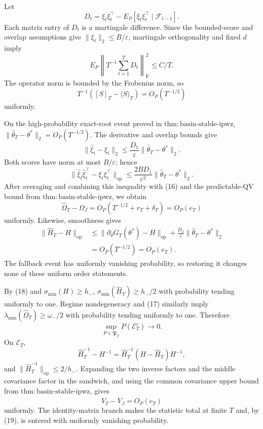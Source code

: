 Let
\[
 D_t=\xi_t\xi_t^\top-E_P[\xi_t\xi_t^\top\mid\mathcal F_{t-1}].
\]
Each matrix entry of \(D_t\) is a martingale difference. Since the bounded-score and overlap assumptions give \(\|\xi_t\|_2\le B/\varepsilon\), martingale orthogonality and fixed \(d\) imply
\[
 E_P\left\|T^{-1}\sum_{t=1}^TD_t\right\|_{\mathrm F}^2\le C/T.
\]
The operator norm is bounded by the Frobenius norm, so
\[
 T^{-1}([S]_T-\langle S\rangle_T)=O_P(T^{-1/2})
\tag{16}
\]
uniformly.

On the high-probability exact-root event proved in \(\mathrm{thm:basin\text{-}stable\text{-}ipwz}\), \(\|\widehat\theta_T-\theta^*\|_2=O_P(T^{-1/2})\). The derivative and overlap bounds give
\[
 \|\widehat\xi_t-\xi_t\|_2
 \le\frac{D_1}{\varepsilon}\|\widehat\theta_T-\theta^*\|_2.
\]
Both scores have norm at most \(B/\varepsilon\); hence
\[
 \|\widehat\xi_t\widehat\xi_t^\top-\xi_t\xi_t^\top\|_{\mathrm{op}}
 \le\frac{2BD_1}{\varepsilon^2}\|\widehat\theta_T-\theta^*\|_2.
\]
After averaging and combining this inequality with (16) and the predictable-QV bound from \(\mathrm{thm:basin\text{-}stable\text{-}ipwz}\), we obtain
\[
 \widehat\Omega_T-\Omega_J
 =O_P(T^{-1/2}+r_T+\delta_T)=O_P(e_T)
\tag{17}
\]
uniformly. Likewise, smoothness gives
\[
\begin{aligned}
 \|\widehat H_T-H\|_{\mathrm{op}}
 &\le\|\partial_\theta G_T(\theta^*)-H\|_{\mathrm{op}}
 +\frac{D_2}{\varepsilon}\|\widehat\theta_T-\theta^*\|_2\\
 &=O_P(T^{-1/2})=O_P(e_T).
\end{aligned}
\tag{18}
\]
The fallback event has uniformly vanishing probability, so restoring it changes none of these uniform order statements.

By (18) and \(\sigma_{\min}(H)\ge h_-\), \(\sigma_{\min}(\widehat H_T)\ge h_-/2\) with probability tending uniformly to one. Regime nondegeneracy and (17) similarly imply \(\lambda_{\min}(\widehat\Omega_T)\ge\omega_-/2\) with probability tending uniformly to one. Therefore
\[
 \sup_{P\in\mathfrak P_T}P(\mathcal E_T^c)\longrightarrow0.
\tag{19}
\]
On \(\mathcal E_T\),
\[
 \widehat H_T^{-1}-H^{-1}=\widehat H_T^{-1}(H-\widehat H_T)H^{-1},
\]
and \(\|\widehat H_T^{-1}\|_{\mathrm{op}}\le2/h_-\). Expanding the two inverse factors and the middle covariance factor in the sandwich, and using the common covariance upper bound from \(\mathrm{thm:basin\text{-}stable\text{-}ipwz}\), gives
\[
 \widehat V_T-V_J=O_P(e_T)
\tag{20}
\]
uniformly. The identity-matrix branch makes the statistic total at finite \(T\) and, by (19), is entered with uniformly vanishing probability.

